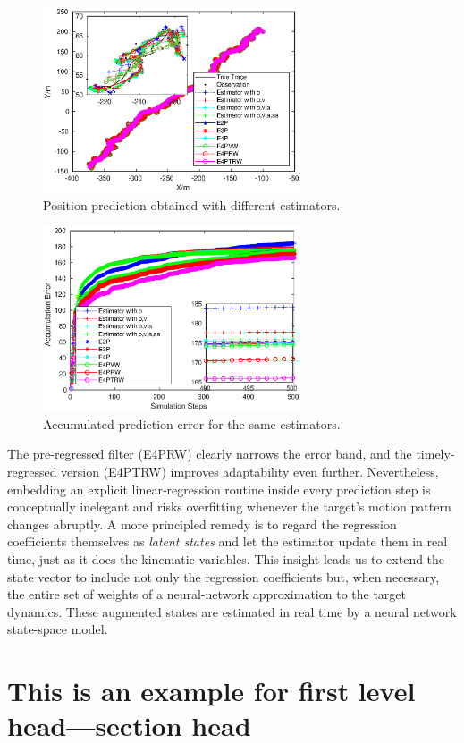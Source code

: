 \documentclass[sn-nature]{sn-jnl}%
\theoremstyle{thmstyleone}%
\theoremstyle{thmstyletwo}%
\theoremstyle{thmstylethree}%
\begin{document}
\begin{figure}[!t]
  \centering
  \includegraphics[width=3in]{fig/fig1_1.eps}
  \caption{Position prediction obtained with different estimators.}
  \label{fig:pos_pred}
\end{figure}

\begin{figure}[!t]
  \centering
  \includegraphics[width=3in]{fig/fig1_2.eps}
  \caption{Accumulated prediction error for the same estimators.}
  \label{fig:acc_err}
\end{figure}

\medskip
The pre-regressed filter (E4PRW) clearly narrows the error band, and the timely-regressed  version (E4PTRW) improves adaptability even further.  Nevertheless, embedding an explicit linear‐regression routine inside every prediction step is conceptually inelegant and risks overfitting whenever the target’s motion pattern changes abruptly.  A more principled remedy is to regard the regression coefficients themselves as \emph{latent states} and let the estimator update them in real time, just as it does the kinematic variables.  This insight leads us to extend the state vector to include not only the regression coefficients but, when necessary, the entire set of weights of a neural-network approximation to the target dynamics.  These augmented states are estimated in real time by a neural network state-space model.


\section{This is an example for first level head---section head}\label{sec3}
\end{document}
